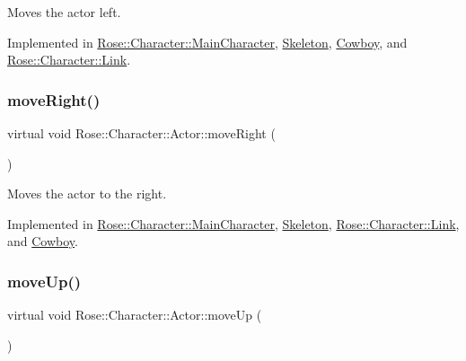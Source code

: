 Moves the actor left. 



Implemented in \mbox{\hyperlink{classRose_1_1Character_1_1MainCharacter_a80dd452d836ec63345c0afbfff664a7e}{Rose\+::\+Character\+::\+Main\+Character}}, \mbox{\hyperlink{classSkeleton_ab03c65cdabc94f280443691653112d3a}{Skeleton}}, \mbox{\hyperlink{classCowboy_a487cf6b5d1e37586e6e9b408d2aaad1a}{Cowboy}}, and \mbox{\hyperlink{classRose_1_1Character_1_1Link_aab6113b81cfa995d11c6aa34894021cf}{Rose\+::\+Character\+::\+Link}}.

\mbox{\label{classRose_1_1Character_1_1Actor_a89ce0e5d1d6d25b1612867b982221dc9}} 
\subsubsection{\texorpdfstring{moveRight()}{moveRight()}}
{\footnotesize\ttfamily virtual void Rose\+::\+Character\+::\+Actor\+::move\+Right (\begin{DoxyParamCaption}{ }\end{DoxyParamCaption})\hspace{0.3cm}{\ttfamily [pure virtual]}}



Moves the actor to the right. 



Implemented in \mbox{\hyperlink{classRose_1_1Character_1_1MainCharacter_a08b5eae4f7ccabe74d1764993b0dcf91}{Rose\+::\+Character\+::\+Main\+Character}}, \mbox{\hyperlink{classSkeleton_a3d8ce7b8a1d10e4a33a27f0eee54042e}{Skeleton}}, \mbox{\hyperlink{classRose_1_1Character_1_1Link_ad93043b13d83e8afb6f33c3c2572b05b}{Rose\+::\+Character\+::\+Link}}, and \mbox{\hyperlink{classCowboy_a2094d31b2535a25ef8a40945473cf884}{Cowboy}}.

\mbox{\label{classRose_1_1Character_1_1Actor_afd7130be2654a3fa94122cf532de4b79}} 
\subsubsection{\texorpdfstring{moveUp()}{moveUp()}}
{\footnotesize\ttfamily virtual void Rose\+::\+Character\+::\+Actor\+::move\+Up (\begin{DoxyParamCaption}{ }\end{DoxyParamCaption})\hspace{0.3cm}{\ttfamily [pure virtual]}}



